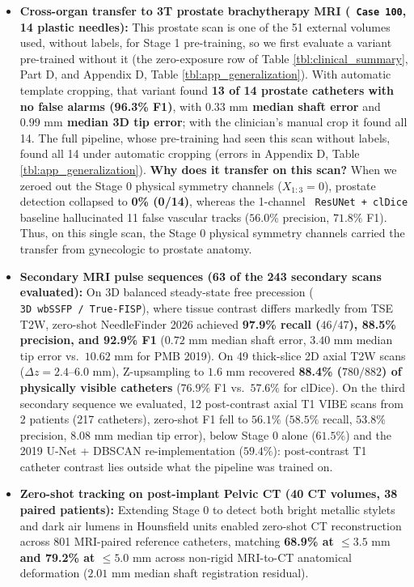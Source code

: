 \documentclass[
  11pt,
]{article}
\providecommand{\tightlist}{%
  \setlength{\itemsep}{0pt}\setlength{\parskip}{0pt}}
\let\nforigtexttt\texttt
\renewcommand{\texttt}[1]{\nforigtexttt{\XeTeXinterchartokenstate=1 #1}}
\begin{document}
\begin{itemize}
\tightlist
\item
  \textbf{Cross-organ transfer to 3T prostate brachytherapy MRI
  (\texttt{Case\ 100}, 14 plastic needles):} This prostate scan is one
  of the 51 external volumes used, without labels, for Stage 1
  pre-training, so we first evaluate a variant pre-trained without it
  (the zero-exposure row of Table \ref{tbl:clinical_summary}, Part D,
  and Appendix D, Table \ref{tbl:app_generalization}). With automatic
  template cropping, that variant found \textbf{13 of 14 prostate
  catheters with no false alarms (96.3\% F1)}, with
  \textbf{\(0.33\text{ mm}\) median shaft error} and
  \textbf{\(0.99\text{ mm}\) median 3D tip error}; with the clinician's
  manual crop it found all 14. The full pipeline, whose pre-training had
  seen this scan without labels, found all 14 under automatic cropping
  (errors in Appendix D, Table \ref{tbl:app_generalization}).
  \textbf{Why does it transfer on this scan?} When we zeroed out the
  Stage 0 physical symmetry channels (\(X_{1:3}=0\)), prostate detection
  collapsed to \textbf{0\% (0/14)}, whereas the 1-channel
  \texttt{ResUNet\ +\ clDice} baseline hallucinated 11 false vascular
  tracks (\(56.0\%\) precision, \(71.8\%\) F1). Thus, on this single
  scan, the Stage 0 physical symmetry channels carried the transfer from
  gynecologic to prostate anatomy.
\item
  \textbf{Secondary MRI pulse sequences (63 of the 243 secondary scans
  evaluated):} On 3D balanced steady-state free precession
  (\texttt{3D\ wbSSFP\ /\ True-FISP}), where tissue contrast differs
  markedly from TSE T2W, zero-shot NeedleFinder 2026 achieved
  \textbf{97.9\% recall (\(46/47\)), 88.5\% precision, and 92.9\% F1}
  (\(0.72\text{ mm}\) median shaft error, \(3.40\text{ mm}\) median tip
  error vs.~\(10.62\text{ mm}\) for PMB 2019). On 49 thick-slice 2D
  axial T2W scans (\(\Delta z = 2.4\text{--}6.0\text{ mm}\)),
  Z-upsampling to \(1.6\text{ mm}\) recovered \textbf{88.4\%
  (\(780/882\)) of physically visible catheters} (\(76.9\%\) F1
  vs.~\(57.6\%\) for clDice). On the third secondary sequence we
  evaluated, 12 post-contrast axial T1 VIBE scans from 2 patients (217
  catheters), zero-shot F1 fell to \(56.1\%\) (\(58.5\%\) recall,
  \(53.8\%\) precision, \(8.08\text{ mm}\) median tip error), below
  Stage 0 alone (\(61.5\%\)) and the 2019 U-Net + DBSCAN
  re-implementation (\(59.4\%\)): post-contrast T1 catheter contrast
  lies outside what the pipeline was trained on.
\item
  \textbf{Zero-shot tracking on post-implant Pelvic CT (40 CT volumes,
  38 paired patients):} Extending Stage 0 to detect both bright metallic
  stylets and dark air lumens in Hounsfield units enabled zero-shot CT
  reconstruction across 801 MRI-paired reference catheters, matching
  \textbf{68.9\% at \(\le 3.5\text{ mm}\) and 79.2\% at
  \(\le 5.0\text{ mm}\)} across non-rigid MRI-to-CT anatomical
  deformation (\(2.01\text{ mm}\) median shaft registration residual).
\end{itemize}
\end{document}

